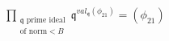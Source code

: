 \documentclass[preview]{standalone}
\begin{document}
\begin{align*}
\prod_{\substack{\mathfrak{q} \text{ prime ideal} \\ \text{of norm} < B}} \mathfrak{q}^{val_{\mathfrak{q}}(\phi_{21})} = (\phi_{21})
\end{align*}
\end{document}
